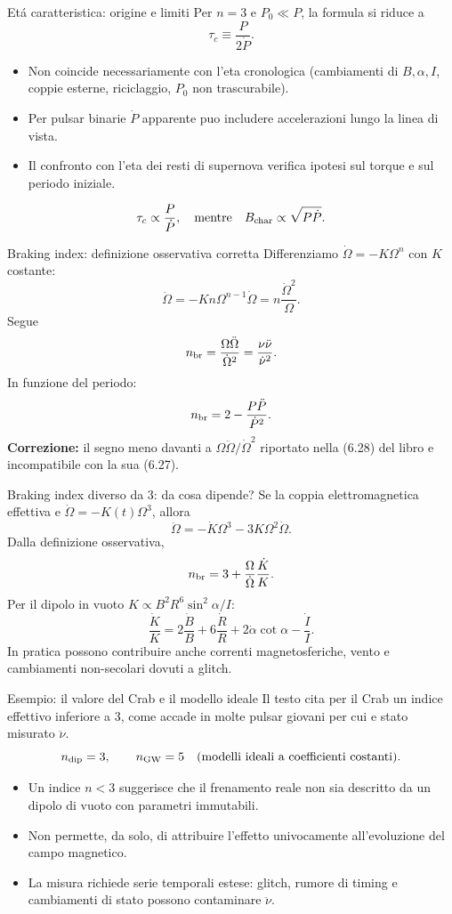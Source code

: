 \begin{frame}[t]{Et\'a caratteristica: origine e limiti}
\small
Per $n=3$ e $P_0\ll P$, la formula si riduce a
\[
\tau_c\equiv\frac{P}{2\dot P}.
\]
\begin{itemize}
\item Non coincide necessariamente con l'eta cronologica (cambiamenti di $B,\alpha,I$, coppie esterne, riciclaggio, $P_0$ non trascurabile).
\item Per pulsar binarie $\dot P$ apparente puo includere accelerazioni lungo la linea di vista.
\item Il confronto con l'eta dei resti di supernova verifica ipotesi sul torque e sul periodo iniziale.
\end{itemize}
\[
\tau_c\propto\frac{P}{\dot P},\quad
\text{mentre}\quad B_{\rm char}\propto\sqrt{P\dot P}.
\]
\end{frame}

\begin{frame}[t]{Braking index: definizione osservativa corretta}
\small
Differenziamo $\dot\Omega=-K\Omega^n$ con $K$ costante:
\[
\ddot\Omega=-Kn\Omega^{n-1}\dot\Omega
=n\frac{\dot\Omega^2}{\Omega}.
\]
Segue
\[
n_{\rm br}=\frac{\Omega\ddot\Omega}{\dot\Omega^2}
=\frac{\nu\ddot\nu}{\dot\nu^2}.
\]
In funzione del periodo:
\[
n_{\rm br}=2-\frac{P\ddot P}{\dot P^2}.
\]
\textbf{Correzione:} il segno meno davanti a $\Omega\ddot\Omega/\dot\Omega^2$ riportato nella (6.28) del libro e incompatibile con la sua (6.27).
\end{frame}

\begin{frame}[t]{Braking index diverso da 3: da cosa dipende?}
\small
Se la coppia elettromagnetica effettiva e $\dot\Omega=-K(t)\Omega^3$, allora
\[
\ddot\Omega=-\dot K\Omega^3-3K\Omega^2\dot\Omega.
\]
Dalla definizione osservativa,
\[
n_{\rm br}=3+\frac{\Omega}{\dot\Omega}\frac{\dot K}{K}.
\]
Per il dipolo in vuoto $K\propto B^2R^6\sin^2\alpha/I$:
\[
\frac{\dot K}{K}=2\frac{\dot B}{B}
+6\frac{\dot R}{R}+2\dot\alpha\cot\alpha-\frac{\dot I}{I}.
\]
In pratica possono contribuire anche correnti magnetosferiche, vento e cambiamenti non-secolari dovuti a glitch.
\end{frame}

\begin{frame}[t]{Esempio: il valore del Crab e il modello ideale}
\small
Il testo cita per il Crab un indice effettivo inferiore a $3$, come accade in molte pulsar giovani per cui e stato misurato $\ddot\nu$.
\[
n_{\rm dip}=3,\qquad n_{\rm GW}=5
\quad\text{(modelli ideali a coefficienti costanti).}
\]
\begin{itemize}
\item Un indice $n<3$ suggerisce che il frenamento reale non sia descritto da un dipolo di vuoto con parametri immutabili.
\item Non permette, da solo, di attribuire l'effetto univocamente all'evoluzione del campo magnetico.
\item La misura richiede serie temporali estese: glitch, rumore di timing e cambiamenti di stato possono contaminare $\ddot\nu$.
\end{itemize}
\end{frame}

